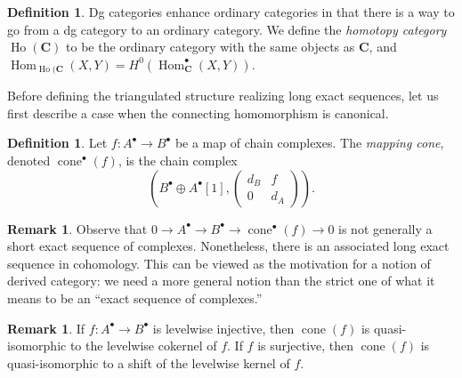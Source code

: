 \documentclass[10pt]{article}
\theoremstyle{definition}
\newtheorem{defn}[thm]{Definition}
\newtheorem{rmk}[thm]{Remark}
\DeclareMathOperator{\Hom}{Hom}
\DeclareMathOperator{\Ho}{Ho}
\DeclareMathOperator{\cone}{cone}
\newcommand{\cat}{\mathbf}
\begin{document}
\begin{defn}
Dg categories enhance ordinary categories in that there is a way to go from a dg category to an ordinary category.  We define the \emph{homotopy category} $\Ho(\cat{C})$ to be the ordinary category with the same objects as $\cat{C}$, and $\Hom_{\Ho(\cat{C}}(X, Y) = H^0(\Hom^\bullet_{\cat{C}}(X, Y))$.
\end{defn}

Before defining the triangulated structure realizing long exact sequences, let us first describe a case when the connecting homomorphism is canonical.
\begin{defn}
Let $f: A^\bullet \rightarrow B^\bullet$ be a map of chain complexes.  The \emph{mapping cone}, denoted $\cone^\bullet(f)$, is the chain complex
$$\left( B^\bullet \oplus A^\bullet[1], \begin{pmatrix} d_B & f \\ 0 & d_A \end{pmatrix} \right).$$
\end{defn}

\begin{rmk}
Observe that $0 \rightarrow A^\bullet \rightarrow B^\bullet \rightarrow \cone^\bullet(f) \rightarrow 0$ is not generally a short exact sequence of complexes.  Nonetheless, there is an associated long exact sequence in cohomology.  This can be viewed as the motivation for a notion of derived category: we need a more general notion than the strict one of what it means to be an ``exact sequence of complexes.''
\end{rmk}

\begin{rmk}
If $f: A^\bullet \rightarrow B^\bullet$ is levelwise injective, then $\cone(f)$ is quasi-isomorphic to the levelwise cokernel of $f$.  If $f$ is surjective, then $\cone(f)$ is quasi-isomorphic to a shift of the levelwise kernel of $f$.
\end{rmk}
\end{document}
